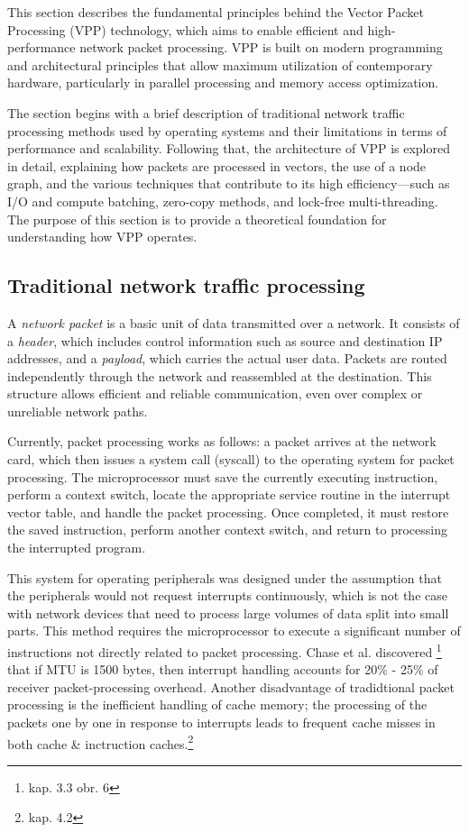 \begin{chapterabstract}
This section describes the fundamental principles behind the Vector Packet Processing (VPP) technology, which aims to enable efficient and high-performance network packet processing. 
VPP is built on modern programming and architectural principles that allow maximum utilization of contemporary hardware, particularly in parallel processing and memory access optimization.
\end{chapterabstract}

The section begins with a brief description of traditional network traffic processing methods used by operating systems and their limitations in terms of performance and scalability. 
Following that, the architecture of VPP is explored in detail, explaining how packets are processed in vectors, the use of a node graph, 
and the various techniques that contribute to its high efficiency—such as I/O and compute batching, zero-copy methods, and lock-free multi-threading. 
The purpose of this section is to provide a theoretical foundation for understanding how VPP operates.

\subsection{Traditional network traffic processing}
A \textit{network packet} is a basic unit of data transmitted over a network. It consists of a \textit{header}, which includes control information such as source and destination IP addresses, 
and a \textit{payload}, which carries the actual user data. 
Packets are routed independently through the network and reassembled at the destination. 
This structure allows efficient and reliable communication, even over complex or unreliable network paths.

Currently, packet processing works as follows: a packet arrives at the network card, which then
issues a system call (syscall) to the operating system for packet processing. The microprocessor
must save the currently executing instruction, perform a context switch, locate the appropriate
service routine in the interrupt vector table, and handle the packet processing. Once completed, it
must restore the saved instruction, perform another context switch, and return to processing the
interrupted program.

This system for operating peripherals was designed under the assumption that the peripherals
would not request interrupts continuously, which is not the case with network devices that need
to process large volumes of data split into small parts. 
This method requires the microprocessor to execute a significant
number of instructions not directly related to packet processing. 
Chase et al. \cite{gallatin1999trapeze} discovered \footnote{kap. 3.3 obr. 6} that if MTU is 1500 bytes, then interrupt handling accounts for 20\% - 25\% of receiver packet-processing overhead.
Another disadvantage of tradidtional packet processing is the inefficient handling of cache memory; the processing of the packets one by one in response to
interrupts leads to frequent cache misses in both cache \& inctruction caches.\footnote{kap. 4.2}\cite{cox2000profiling} 

